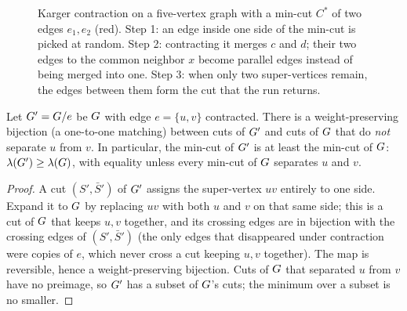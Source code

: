 \begin{figure}[H]
\caption{Karger contraction on a five-vertex graph with a min-cut $C^*$ of two edges $e_1,e_2$ (red). Step 1: an edge inside one side of the min-cut is picked at random. Step 2: contracting it merges $c$ and $d$; their two edges to the common neighbor $x$ become parallel edges instead of being merged into one. Step 3: when only two super-vertices remain, the edges between them form the cut that the run returns.}
\label{ch11:fig-contract}
\end{figure}

\begin{lemma}\label{ch11:lem-contract}
Let $G'=G/e$ be $G$ with edge $e=\{u,v\}$ contracted. There is a weight-preserving bijection (a one-to-one matching) between cuts of $G'$ and cuts of $G$ that do \emph{not} separate $u$ from $v$. In particular, the min-cut of $G'$ is at least the min-cut of $G$: $\lambda(G')\ge\lambda(G)$, with equality unless every min-cut of $G$ separates $u$ and $v$.
\end{lemma}

\begin{proof}
A cut $(S',\bar S')$ of $G'$ assigns the super-vertex $uv$ entirely to one side. Expand it to $G$ by replacing $uv$ with both $u$ and $v$ on that same side; this is a cut of $G$ that keeps $u,v$ together, and its crossing edges are in bijection with the crossing edges of $(S',\bar S')$ (the only edges that disappeared under contraction were copies of $e$, which never cross a cut keeping $u,v$ together). The map is reversible, hence a weight-preserving bijection. Cuts of $G$ that separated $u$ from $v$ have no preimage, so $G'$ has a subset of $G$'s cuts; the minimum over a subset is no smaller.
\end{proof}

